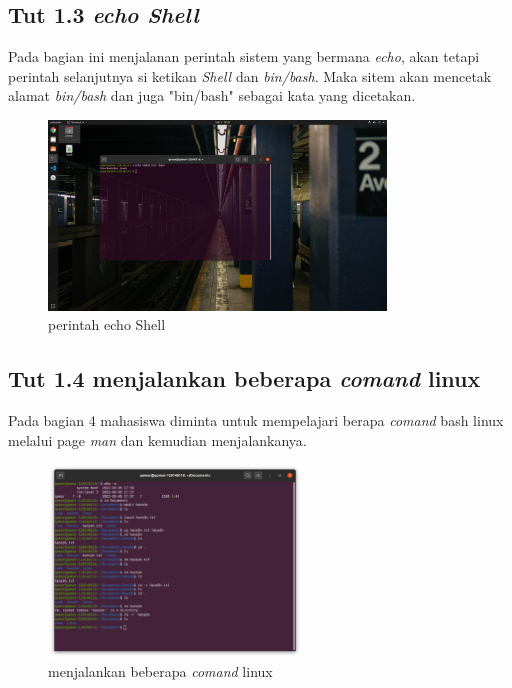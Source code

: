 \documentclass[11pt,a4paper]{article}
\begin{document}
\subsection{Tut 1.3 \textit{echo Shell}}
	Pada bagian ini menjalanan perintah sistem yang bermana \textit{echo}, akan tetapi perintah selanjutnya si ketikan \textit{Shell} dan \textit{bin/bash}.
	Maka sitem akan mencetak alamat \textit{bin/bash} dan juga "bin/bash" sebagai kata yang dicetakan.
	\begin{figure}[h]
		\centering
		\includegraphics[width=0.8\textwidth]{figure/tut1_bagian3.png}
		\caption{perintah echo Shell}
	\end{figure}

\subsection{Tut 1.4 menjalankan beberapa \textit{comand} linux}
	Pada bagian 4 mahasiswa diminta untuk mempelajari berapa \textit{comand} bash linux melalui page \textit{man} dan kemudian menjalankanya.
	\begin{figure}[h]
		\centering
		\includegraphics[width=0.6\textwidth, ]{figure/tut1_bagian4.png}
		\caption{menjalankan beberapa \textit{comand} linux}
	\end{figure}
\end{document}
